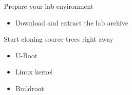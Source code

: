 {
  Prepare your lab environment
  \begin{itemize}
  \item Download and extract the lab archive
  \end{itemize}

  Start cloning source trees right away
  \begin{itemize}
  \item U-Boot
  \item Linux kernel
  \item Buildroot
  \end{itemize}
}
